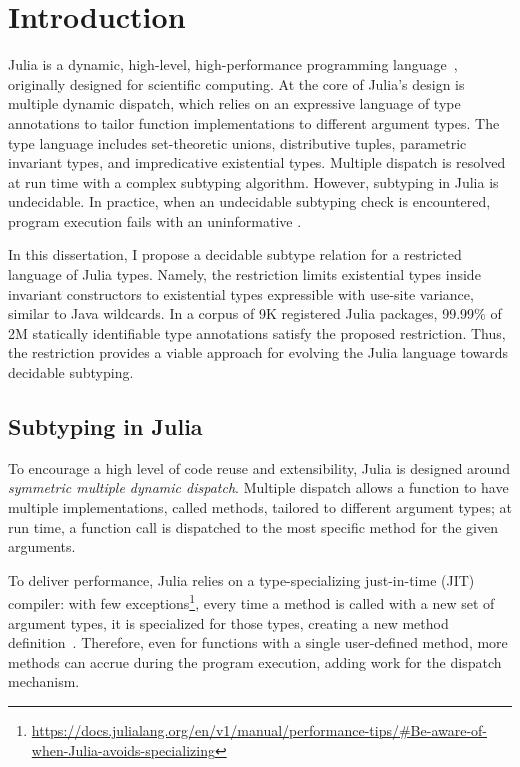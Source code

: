 \chapter{Introduction}

Julia is a dynamic, high-level, high-performance programming
language~\cite{bib:bezanson:julia-fresh:2017},
originally designed for scientific computing.
At the core of Julia's design is multiple dynamic dispatch, which relies
on an expressive language of type annotations to tailor function implementations
to different argument types. The type language includes set-theoretic unions, 
distributive tuples, parametric invariant types, and impredicative existential 
types. Multiple dispatch is resolved at run time
with a complex subtyping algorithm.
However, subtyping in Julia is undecidable. In practice, when an undecidable
subtyping check is encountered, program execution fails 
with an uninformative .

In this dissertation, I propose a decidable subtype relation for a restricted
language of Julia types. Namely, the restriction limits existential types 
inside invariant constructors to existential types expressible with 
use-site variance, similar to Java wildcards.
In a corpus of 9K registered Julia packages, 99.99\% of 2M 
statically identifiable type annotations satisfy the proposed restriction.
Thus, the restriction provides a viable approach for evolving the Julia
language towards decidable subtyping.

\section{Subtyping in Julia}

To encourage a high level of code reuse and extensibility,
Julia is designed around \emph{symmetric multiple dynamic dispatch}.
Multiple dispatch allows a function to have multiple implementations, called
methods, tailored to different argument types; at run time, a function
call is dispatched to the most specific method for the given arguments.

To deliver performance, Julia relies on a type-specializing just-in-time (JIT)
compiler: with few exceptions\footnote{%
\url{https://docs.julialang.org/en/v1/manual/performance-tips/\#Be-aware-of-when-Julia-avoids-specializing}
}, %
every time a method is called with a new set of argument types,
it is specialized for those types, creating a new method
definition~\cite{bib:pelenitsyn:type-stability:oopsla:2021}.
Therefore, even for functions with a single user-defined method,
more methods can accrue during the program execution,
adding work for the dispatch mechanism.

